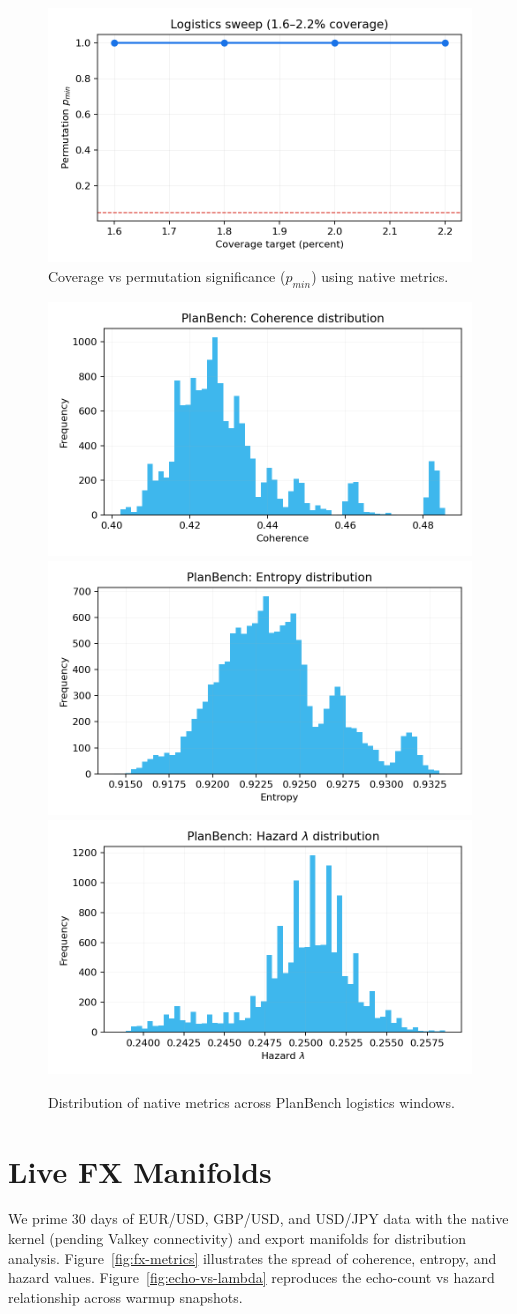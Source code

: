 \documentclass[11pt]{article}
\begin{document}
\begin{figure}[t]
  \centering
  \includegraphics[width=0.75\linewidth]{../figures/fig1_logistics_sweep.png}
  \caption{Coverage vs permutation significance ($p_{min}$) using native metrics.}
  \label{fig:logistics-sweep}
\end{figure}

\begin{figure}[t]
  \centering
  \includegraphics[width=0.32\linewidth]{../figures/planbench_metrics/planbench_coherence_hist.png}
  \includegraphics[width=0.32\linewidth]{../figures/planbench_metrics/planbench_entropy_hist.png}
  \includegraphics[width=0.32\linewidth]{../figures/planbench_metrics/planbench_lambda_hist.png}
  \caption{Distribution of native metrics across PlanBench logistics windows.}
  \label{fig:planbench-metrics}
\end{figure}

\section{Live FX Manifolds}
We prime 30 days of EUR/USD, GBP/USD, and USD/JPY data with the native kernel (pending Valkey connectivity) and export manifolds for distribution analysis. Figure~\ref{fig:fx-metrics} illustrates the spread of coherence, entropy, and hazard values. Figure~\ref{fig:echo-vs-lambda} reproduces the echo-count vs hazard relationship across warmup snapshots.
\end{document}
